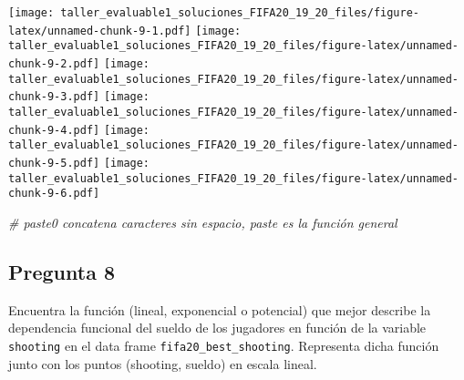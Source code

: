\documentclass[
]{article}
\newenvironment{Shaded}{\begin{snugshade}}{\end{snugshade}}
\newcommand{\CharTok}[1]{\textcolor[rgb]{0.31,0.60,0.02}{#1}}
\newcommand{\CommentTok}[1]{\textcolor[rgb]{0.56,0.35,0.01}{\textit{#1}}}
\newcommand{\ControlFlowTok}[1]{\textcolor[rgb]{0.13,0.29,0.53}{\textbf{#1}}}
\newcommand{\DataTypeTok}[1]{\textcolor[rgb]{0.13,0.29,0.53}{#1}}
\newcommand{\DecValTok}[1]{\textcolor[rgb]{0.00,0.00,0.81}{#1}}
\newcommand{\FloatTok}[1]{\textcolor[rgb]{0.00,0.00,0.81}{#1}}
\newcommand{\KeywordTok}[1]{\textcolor[rgb]{0.13,0.29,0.53}{\textbf{#1}}}
\newcommand{\NormalTok}[1]{#1}
\newcommand{\OperatorTok}[1]{\textcolor[rgb]{0.81,0.36,0.00}{\textbf{#1}}}
\newcommand{\OtherTok}[1]{\textcolor[rgb]{0.56,0.35,0.01}{#1}}
\newcommand{\StringTok}[1]{\textcolor[rgb]{0.31,0.60,0.02}{#1}}
\begin{document}
\begin{Shaded}
\end{Shaded}

\texttt{[image: taller\_evaluable1\_soluciones\_FIFA20\_19\_20\_files/figure-latex/unnamed-chunk-9-1.pdf]}
\texttt{[image: taller\_evaluable1\_soluciones\_FIFA20\_19\_20\_files/figure-latex/unnamed-chunk-9-2.pdf]}
\texttt{[image: taller\_evaluable1\_soluciones\_FIFA20\_19\_20\_files/figure-latex/unnamed-chunk-9-3.pdf]}
\texttt{[image: taller\_evaluable1\_soluciones\_FIFA20\_19\_20\_files/figure-latex/unnamed-chunk-9-4.pdf]}
\texttt{[image: taller\_evaluable1\_soluciones\_FIFA20\_19\_20\_files/figure-latex/unnamed-chunk-9-5.pdf]}
\texttt{[image: taller\_evaluable1\_soluciones\_FIFA20\_19\_20\_files/figure-latex/unnamed-chunk-9-6.pdf]}

\begin{Shaded}
\begin{Highlighting}[]
\CommentTok{# paste0  concatena  caracteres sin espacio, paste es la función general}
\end{Highlighting}
\end{Shaded}

\hypertarget{pregunta-8}{%
\subsection{Pregunta 8}\label{pregunta-8}}

Encuentra la función (lineal, exponencial o potencial) que mejor
describe la dependencia funcional del sueldo de los jugadores en función
de la variable \texttt{shooting} en el data frame
\texttt{fifa20\_best\_shooting}. Representa dicha función junto con los
puntos (shooting, sueldo) en escala lineal.
\end{document}
